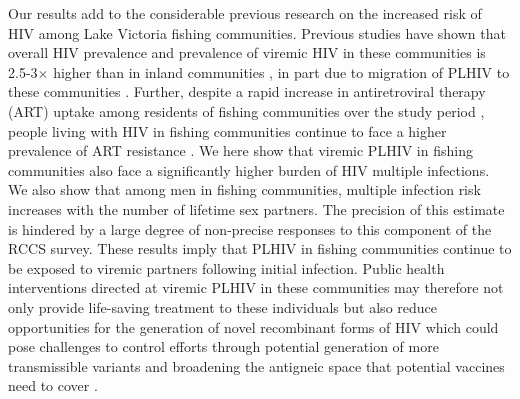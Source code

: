 \documentclass[10pt,letterpaper]{article}
\begin{document}
Our results add to the considerable previous research on the increased risk of HIV among Lake Victoria fishing communities. Previous studies have shown that overall HIV prevalence and prevalence of viremic HIV in these communities is 2.5-3$\times$ higher than in inland communities \cite{chang2016, brizzi2024}, in part due to migration of PLHIV to these communities \cite{grabowski2020,ratmann2020}. Further, despite a rapid increase in antiretroviral therapy (ART) uptake among residents of fishing communities over the study period \cite{kagaayi2019}, people living with HIV in fishing communities continue to face a higher prevalence of ART resistance \cite{martin2023}. We here show that viremic PLHIV in fishing communities also face a significantly higher burden of HIV multiple infections. We also show that among men in fishing communities, multiple infection risk increases with the number of lifetime sex partners. The precision of this estimate is hindered by a large degree of non-precise responses to this component of the RCCS survey. These results imply that PLHIV in fishing communities continue to be exposed to viremic partners following initial infection. Public health interventions directed at viremic PLHIV in these communities may therefore not only provide life-saving treatment to these individuals but also reduce opportunities for the generation of novel recombinant forms of HIV which could pose challenges to control efforts through potential generation of more transmissible variants and broadening the antigneic space that potential vaccines need to cover \cite{rambaut2004,corey2010, ritchie2014, kiwanuka2009, shriner2004, song2018}. \par
\end{document}
